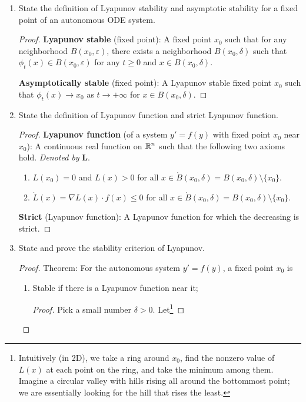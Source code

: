 \documentclass[../psets.tex]{subfiles}
\begin{document}
\begin{enumerate}
    \item State the definition of Lyapunov stability and asymptotic stability for a fixed point of an autonomous ODE system.
    \begin{proof}
        \textbf{Lyapunov stable} (fixed point): A fixed point $x_0$ such that for any neighborhood $B(x_0,\varepsilon)$, there exists a neighborhood $B(x_0,\delta)$ such that $\phi_t(x)\in B(x_0,\varepsilon)$ for any $t\geq 0$ and $x\in B(x_0,\delta)$.\par
        \textbf{Asymptotically stable} (fixed point): A Lyapunov stable fixed point $x_0$ such that $\phi_t(x)\to x_0$ as $t\to+\infty$ for $x\in B(x_0,\delta)$.
    \end{proof}
    \item State the definition of Lyapunov function and strict Lyapunov function.
    \begin{proof}
        \textbf{Lyapunov function} (of a system $y'=f(y)$ with fixed point $x_0$ near $x_0$): A continuous real function on $\mathbb{R}^n$ such that the following two axioms hold. \emph{Denoted by} $\bm{L}$.
        \begin{enumerate}
            \item $L(x_0)=0$ and $L(x)>0$ for all $x\in\mathring{B}(x_0,\delta)=B(x_0,\delta)\setminus\{x_0\}$.
            \item $\dot{L}(x)=\nabla L(x)\cdot f(x)\leq 0$ for all $x\in\mathring{B}(x_0,\delta)=B(x_0,\delta)\setminus\{x_0\}$.
        \end{enumerate}
        \textbf{Strict} (Lyapunov function): A Lyapunov function for which the decreasing is strict.
    \end{proof}
    \item State and prove the stability criterion of Lyapunov.
    \begin{proof}
        Theorem: For the autonomous system $y'=f(y)$, a fixed point $x_0$ is
        \begin{enumerate}
            \item Stable if there is a Lyapunov function near it;
            \begin{proof}
                Pick a small number $\delta>0$. Let\footnote{Intuitively (in 2D), we take a ring around $x_0$, find the nonzero value of $L(x)$ at each point on the ring, and take the minimum among them. Imagine a circular valley with hills rising all around the bottommost point; we are essentially looking for the hill that rises the least.}

\end{proof}
\end{enumerate}
\end{proof}
\end{enumerate}
\end{document}
